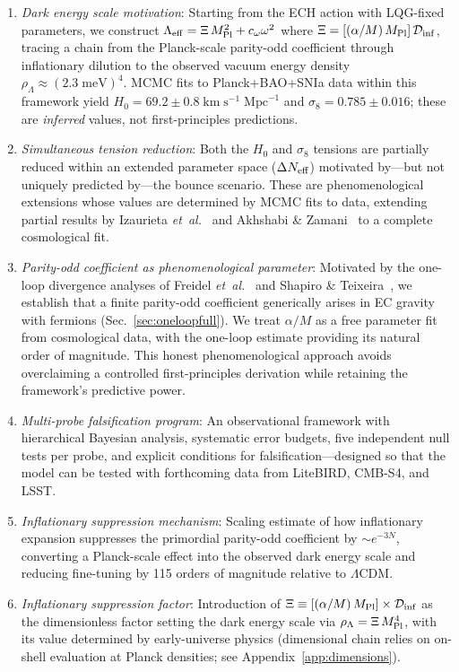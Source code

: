 \documentclass[aps,prd,twocolumn,superscriptaddress,showpacs,preprintnumbers,nofootinbib,longbibliography,floatfix]{revtex4-2}
\newcommand{\Leff}{\Lambda_{\rm eff}}
\newcommand{\Dinf}{\mathcal{D}_{\rm inf}}
\newcommand{\MPl}{M_{\rm Pl}}
\newcommand{\Neff}{N_{\rm eff}}
\newcommand{\etal}{\textit{et~al.}}
\begin{document}
\begin{enumerate}[leftmargin=*]
\item \textit{Dark energy scale motivation}: Starting from the ECH action with LQG-fixed parameters, we construct $\Leff = \Xi\,\MPl^2 + c_\omega\omega^2$ where $\Xi = [(\alpha/M)\,\MPl]\,\Dinf$, tracing a chain from the Planck-scale parity-odd coefficient through inflationary dilution to the observed vacuum energy density $\rho_\Lambda\approx(2.3\;\text{meV})^4$. MCMC fits to Planck+BAO+SNIa data within this framework yield $H_0 = 69.2 \pm 0.8\;\text{km}\;\text{s}^{-1}\;\text{Mpc}^{-1}$ and $\sigma_8 = 0.785 \pm 0.016$; these are \textit{inferred} values, not first-principles predictions.

\item \textit{Simultaneous tension reduction}: Both the $H_0$ and $\sigma_8$ tensions are partially reduced within an extended parameter space ($\Delta\Neff$) motivated by---but not uniquely predicted by---the bounce scenario. These are phenomenological extensions whose values are determined by MCMC fits to data, extending partial results by Izaurieta \etal~\cite{Izaurieta2020} and Akhshabi \& Zamani~\cite{Akhshabi2023} to a complete cosmological fit.

\item \textit{Parity-odd coefficient as phenomenological parameter}: Motivated by the one-loop divergence analyses of Freidel \etal~\cite{Freidel2005} and Shapiro \& Teixeira~\cite{ShapiroTeixeira2014}, we establish that a finite parity-odd coefficient generically arises in EC gravity with fermions (Sec.~\ref{sec:oneloopfull}). We treat $\alpha/M$ as a free parameter fit from cosmological data, with the one-loop estimate providing its natural order of magnitude. This honest phenomenological approach avoids overclaiming a controlled first-principles derivation while retaining the framework's predictive power.

\item \textit{Multi-probe falsification program}: An observational framework with hierarchical Bayesian analysis, systematic error budgets, five independent null tests per probe, and explicit conditions for falsification---designed so that the model can be tested with forthcoming data from LiteBIRD, CMB-S4, and LSST.

\item \textit{Inflationary suppression mechanism}: Scaling estimate of how inflationary expansion suppresses the primordial parity-odd coefficient by $\sim e^{-3N}$, converting a Planck-scale effect into the observed dark energy scale and reducing fine-tuning by 115 orders of magnitude relative to $\Lambda$CDM.

\item \textit{Inflationary suppression factor}: Introduction of $\Xi\equiv[(\alpha/M)\,\MPl]\times\Dinf$ as the dimensionless factor setting the dark energy scale via $\rho_\Lambda = \Xi\,\MPl^4$, with its value determined by early-universe physics (dimensional chain relies on on-shell evaluation at Planck densities; see Appendix~\ref{app:dimensions}).
\end{enumerate}
\end{document}
